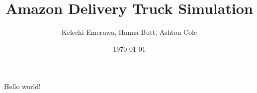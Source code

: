 \documentclass[letterpaper]{article}
\title{Amazon Delivery Truck Simulation}
\author{Kelechi Emeruwa, Hanna Butt, Ashton Cole}
\date{\today}
\begin{document}
    \maketitle
    Hello world!
\end{document}
